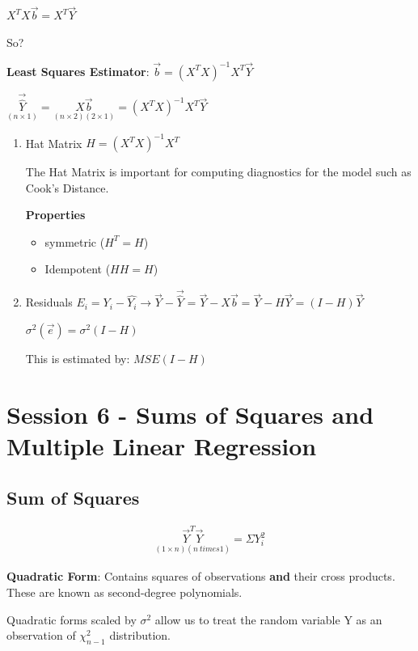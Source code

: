 \documentclass[11pt]{article}
\begin{document}
\(X^T X \vec{b} = X^T \vec{Y}\)

So?

\textbf{Least Squares Estimator}: \(\vec{b} = (X^T X)^{-1} X^T \vec{Y}\)

\(\underset{(n \times 1)}{\vec{\hat{Y}}} = \underset{(n \times 2)(2 \times
1)}{X \vec{b}} = (X^T X)^{-1} X^T \vec{Y}\)

\begin{enumerate}
\item Hat Matrix
\label{sec:orgedaf879}
\(H = (X^T X)^{-1} X^T\)

The Hat Matrix is important for computing diagnostics for the model such as
Cook's Distance.

\textbf{Properties}
\begin{itemize}
\item symmetric (\(H^T = H\))
\item Idempotent (\(HH = H\))
\end{itemize}

\item Residuals
\label{sec:orgcba1251}
\(E_i = Y_i - \hat{Y_i} \to \vec{Y} - \vec{\hat{Y}} = \vec{Y} - X \vec{b} =
\vec{Y} - H \vec{Y} = (I - H) \vec{Y}\)

\(\sigma^2(\vec{e}) = \sigma^2(I - H)\)

This is estimated by: \(MSE (I - H)\)
\end{enumerate}
\section{Session 6 - Sums of Squares and Multiple Linear Regression}
\label{sec:org0a55bdc}

\subsection{Sum of Squares}
\label{sec:org67dc15a}

\begin{equation}
\begin{split}
\underset{(1 \times n)(n \ times 1)}{\vec{Y}^T \vec{Y}} = \Sigma Y_i^2
\end{split}
\end{equation}

\textbf{Quadratic Form}: Contains squares of observations \textbf{and} their cross products.
 These are known as second-degree polynomials.

Quadratic forms scaled by \(\sigma^2\) allow us to treat the random variable Y as
an observation of \(\chi^2_{n - 1}\) distribution.
\end{document}
